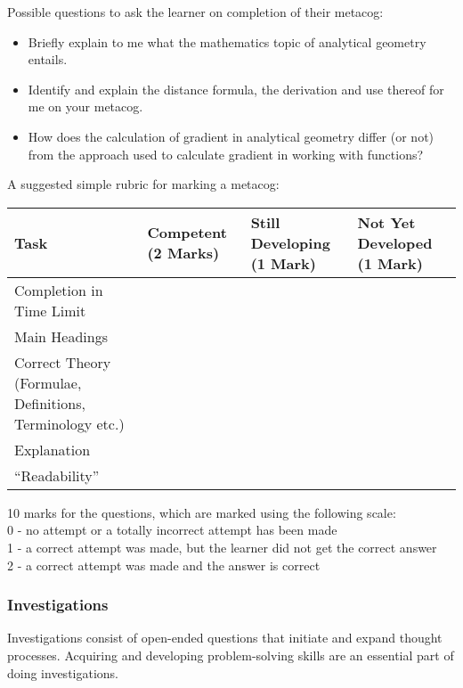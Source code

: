 Possible questions to ask the learner on completion of their metacog: 
\begin{itemize}
\item Briefly explain to me what the mathematics topic of analytical geometry entails.
\item Identify and explain the distance formula, the derivation and use thereof for me on your metacog.
\item How does the calculation of gradient in analytical geometry differ (or not) from the approach used to calculate gradient in working with functions? 
\end{itemize}
A suggested simple rubric for marking a metacog:
\begin{table}[H]
 \begin{center}
  \begin{tabular}{|p{3cm}|p{2.5cm}|p{2.5cm}|p{2.5cm}|} \hline
  \textbf{Task} & \textbf{Competent (2 Marks)} & \textbf{Still Developing (1 Mark)}& \textbf{Not Yet Developed (1 Mark)}\\ \hline
Completion in Time Limit &&&\\ \hline
Main Headings&&&\\ \hline
Correct Theory (Formulae, Definitions, Terminology etc.) &&&\\ \hline
Explanation &&&\\ \hline
“Readability”&&&\\ \hline

  \end{tabular}

 \end{center}

\end{table}

10 marks for the questions, which are marked using the following scale:\\
0	-	no attempt or a totally incorrect attempt has been made \\
1	-	a correct attempt was made, but the learner did not get the correct answer \\
2	-	a correct attempt was made and the answer is correct\\

\subsubsection{Investigations}
Investigations consist of open-ended questions that initiate and expand thought processes. Acquiring and developing problem-solving skills are an essential part of doing investigations. \par 

